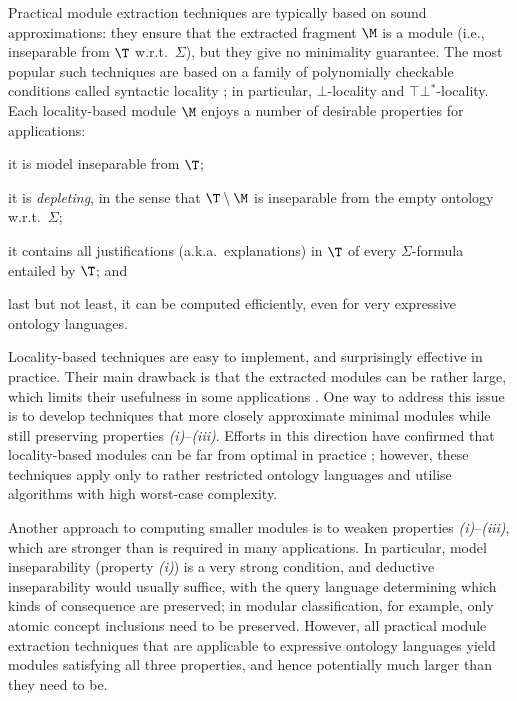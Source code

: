 Practical module extraction techniques are typically based on
sound approximations: they ensure that the extracted fragment
$\M$ is a module (i.e., inseparable from $\T$ w.r.t.\ $\Sigma$),
but they give no minimality guarantee. The most popular
such techniques are based on a family of polynomially checkable
conditions called syntactic 
locality \cite{DBLP:conf/www/GrauHKS07,GrauHKS08JAIR,WhichKindOfModule}; in
particular, $\bot$-locality  and 
$\top\!\bot\!^*$-locality.  
Each locality-based module $\M$ enjoys a number of desirable properties
for applications:
\begin{inparaenum}[\it (i)]
 \item it is model inseparable from $\T$;
 \item it is \emph{depleting}, in the sense that $\T \setminus \M$
 is inseparable from the empty ontology w.r.t.\ $\Sigma$; 
 \item it contains all justifications  (a.k.a.\ explanations) in $\T$
 of every $\Sigma$-formula entailed by $\T$; and
\item last but not least, it can be computed
efficiently, even for very expressive
ontology languages.
\end{inparaenum}

Locality-based techniques are easy to implement, and
surprisingly effective in practice. Their main drawback is that the
extracted modules can be rather large, which limits their 
usefulness in some applications \cite{VescovoKPS0T13}.
One way to address this issue is to develop techniques that more closely approximate minimal modules while still preserving properties \emph{(i)}--\emph{(iii)}.
Efforts in this direction have confirmed that locality-based modules can
be far from optimal in practice \cite{DBLP:conf/dlog/GatensKW14};
however, these techniques
apply only to rather restricted ontology languages and utilise algorithms with high worst-case
\mbox{complexity}.

Another approach to computing smaller modules is to weaken 
properties \emph{(i)}--\emph{(iii)}, which are stronger
than is required in many applications.
In particular, model inseparability (property \emph{(i)}) is
a very strong condition, and
deductive inseparability would usually suffice,
with the query language determining which kinds of 
consequence are preserved; in modular classification, for example,
only atomic concept inclusions need to be preserved.
However, 
all practical module extraction techniques that are applicable
to expressive ontology languages yield modules satisfying
all three properties, and  hence potentially 
much larger than they need to be.

